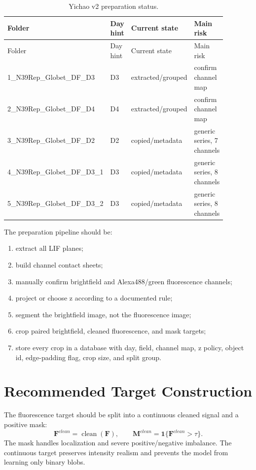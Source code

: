 \documentclass[11pt]{article}
\newcommand{\F}{\mathbf{F}}
\newcommand{\M}{\mathbf{M}}
\begin{document}
\begin{longtable}{@{}p{0.30\linewidth}p{0.16\linewidth}p{0.16\linewidth}p{0.26\linewidth}@{}}
\caption{Yichao v2 preparation status.}\label{tab:v2}\\
\toprule
Folder & Day hint & Current state & Main risk\\
\midrule
\endfirsthead
\toprule
Folder & Day hint & Current state & Main risk\\
\midrule
\endhead
1\_N39Rep\_Globet\_DF\_D3 & D3 & extracted/grouped & confirm channel map\\
2\_N39Rep\_Globet\_DF\_D4 & D4 & extracted/grouped & confirm channel map\\
3\_N39Rep\_Globet\_DF\_D2 & D2 & copied/metadata & generic series, 7 channels\\
4\_N39Rep\_Globet\_DF\_D3\_1 & D3 & copied/metadata & generic series, 8 channels\\
5\_N39Rep\_Globet\_DF\_D3\_2 & D3 & copied/metadata & generic series, 8 channels\\
\bottomrule
\end{longtable}

The preparation pipeline should be:
\begin{enumerate}[leftmargin=1.5em]
  \item extract all LIF planes;
  \item build channel contact sheets;
  \item manually confirm brightfield and Alexa488/green fluorescence channels;
  \item project or choose z according to a documented rule;
  \item segment the brightfield image, not the fluorescence image;
  \item crop paired brightfield, cleaned fluorescence, and mask targets;
  \item store every crop in a database with day, field, channel map, z policy, object id, edge-padding flag, crop size, and split group.
\end{enumerate}

\section{Recommended Target Construction}
The fluorescence target should be split into a continuous cleaned signal and a positive mask:
\[
\F^{clean} = \operatorname{clean}(\F),\qquad
\M^{clean} = \mathbf{1}\{\F^{clean}>\tau\}.
\]
The mask handles localization and severe positive/negative imbalance. The continuous target preserves intensity realism and prevents the model from learning only binary blobs.
\end{document}
